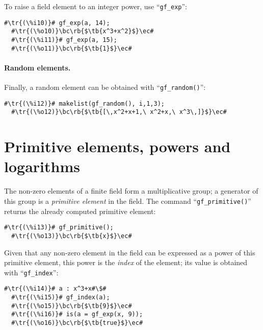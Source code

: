 \documentclass[a4paper,11pt,leqno,fleqn]{artikel3}
\newcommand{\bc}{\begin{center}}
\newcommand{\ec}{\end{center}}
\newcommand{\tr}[1]{\textcolor{red}{#1}}
\newcommand{\tb}[1]{\textcolor{blue}{#1}}
\newcommand{\rb}[1]{\raisebox{2mm}[0mm][1mm]{#1}}
\begin{document}
To raise a field element to an integer power, use ``\verb!gf_exp!'':

\vspace*{2mm}
\begin{lstlisting}[escapechar=\#]
  #\tr{(\%i10)}# gf_exp(a, 14);
  #\tr{(\%o10)}\bc\rb{$\tb{x^3+x^2}$}\ec#
  #\tr{(\%i11)}# gf_exp(a, 15);
  #\tr{(\%o11)}\bc\rb{$\tb{1}$}\ec#
\end{lstlisting}


\paragraph{Random elements.}

Finally, a random element can be obtained with ``\verb!gf_random()!'':

\vspace*{2mm}
\begin{lstlisting}[escapechar=\#]
  #\tr{(\%i12)}# makelist(gf_random(), i,1,3);
  #\tr{(\%o12)}\bc\rb{$\tb{[\,x^2+x+1,\ x^2+x,\ x^3\,]}$}\ec#
\end{lstlisting}


\section*{Primitive elements, powers and logarithms}

The non-zero elements of a finite field form a multiplicative group; a
generator of this group is a \emph{primitive element} in the field.  The
command ``\verb!gf_primitive()!'' returns the already computed primitive element:

\vspace*{2mm}
\begin{lstlisting}[escapechar=\#]
  #\tr{(\%i13)}# gf_primitive();
  #\tr{(\%o13)}\bc\rb{$\tb{x}$}\ec#
\end{lstlisting}

Given that any non-zero element in the field can be expressed as a power of
this primitive element, this power is the \emph{index} of the element; its
value is obtained with ``\verb!gf_index!'':

\vspace*{2mm}
\begin{lstlisting}[escapechar=\#]
  #\tr{(\%i14)}# a : x^3+x#\$#
  #\tr{(\%i15)}# gf_index(a);
  #\tr{(\%o15)}\bc\rb{$\tb{9}$}\ec#
  #\tr{(\%i16)}# is(a = gf_exp(x, 9));
  #\tr{(\%o16)}\bc\rb{$\tb{true}$}\ec#
\end{lstlisting}
\end{document}
